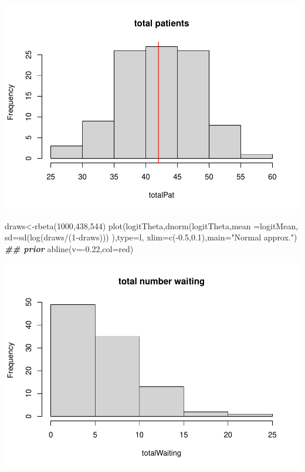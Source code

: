 \documentclass[
]{book}
\newenvironment{Shaded}{\begin{snugshade}}{\end{snugshade}}
\newcommand{\AttributeTok}[1]{\textcolor[rgb]{0.77,0.63,0.00}{#1}}
\newcommand{\DecValTok}[1]{\textcolor[rgb]{0.00,0.00,0.81}{#1}}
\newcommand{\DocumentationTok}[1]{\textcolor[rgb]{0.56,0.35,0.01}{\textbf{\textit{#1}}}}
\newcommand{\FloatTok}[1]{\textcolor[rgb]{0.00,0.00,0.81}{#1}}
\newcommand{\FunctionTok}[1]{\textcolor[rgb]{0.00,0.00,0.00}{#1}}
\newcommand{\NormalTok}[1]{#1}
\newcommand{\OtherTok}[1]{\textcolor[rgb]{0.56,0.35,0.01}{#1}}
\newcommand{\SpecialCharTok}[1]{\textcolor[rgb]{0.00,0.00,0.00}{#1}}
\newcommand{\StringTok}[1]{\textcolor[rgb]{0.31,0.60,0.02}{#1}}
\theoremstyle{definition}
\theoremstyle{definition}
\theoremstyle{definition}
\theoremstyle{definition}
\theoremstyle{remark}
\begin{document}
\includegraphics{_main_files/figure-latex/unnamed-chunk-10-1.pdf}

\begin{Shaded}
\begin{Highlighting}[]
\NormalTok{  draws}\OtherTok{\textless{}{-}}\FunctionTok{rbeta}\NormalTok{(}\DecValTok{1000}\NormalTok{,}\DecValTok{438}\NormalTok{,}\DecValTok{544}\NormalTok{)}
  \FunctionTok{plot}\NormalTok{(logitTheta,}\FunctionTok{dnorm}\NormalTok{(logitTheta,}\AttributeTok{mean =}\NormalTok{logitMean, }\AttributeTok{sd=}\FunctionTok{sd}\NormalTok{(}\FunctionTok{log}\NormalTok{(draws}\SpecialCharTok{/}\NormalTok{(}\DecValTok{1}\SpecialCharTok{{-}}\NormalTok{draws))) ),}\AttributeTok{type=}\StringTok{\textquotesingle{}l\textquotesingle{}}\NormalTok{, }\AttributeTok{xlim=}\FunctionTok{c}\NormalTok{(}\SpecialCharTok{{-}}\FloatTok{0.5}\NormalTok{,}\FloatTok{0.1}\NormalTok{),}\AttributeTok{main=}\StringTok{"Normal approx."}\NormalTok{) }\DocumentationTok{\#\# prior}
    \FunctionTok{abline}\NormalTok{(}\AttributeTok{v=}\SpecialCharTok{{-}}\FloatTok{0.22}\NormalTok{,}\AttributeTok{col=}\StringTok{\textquotesingle{}red\textquotesingle{}}\NormalTok{)}
\end{Highlighting}
\end{Shaded}

\includegraphics{_main_files/figure-latex/unnamed-chunk-10-2.pdf}
\end{document}
